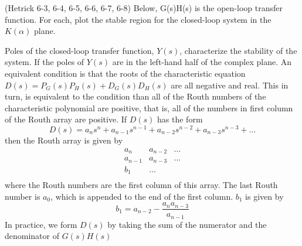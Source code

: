 \documentclass[11pt,addpoints,answers]{exam}
\begin{document}
\begin{questions}
        \question (Hetrick 6-3, 6-4, 6-5, 6-6, 6-7, 6-8) Below, G(s)H(s) is the open-loop transfer function. For each, 
        plot the stable region for the closed-loop system in the $K(\alpha)$ 
        plane.
        \begin{parts}
            Poles of the closed-loop transfer function, $Y(s)$, characterize the
            stability of the system. If the poles of $Y(s)$ are in the
            left-hand half of the complex plane. An equivalent condition is
            that the roots of the characteristic equation
            $D(s)=P_{G}(s)P_{H}(s) + D_{G}(s) D_{H}(s)$ are all negative and
            real. This in turn, is equivalent to the condition than all of the
            Routh numbers of the characteristic polynomial are positive, that
            is, all of the numbers in first column of the Routh array are
            positive. If $D(s)$ has the form
            \[
                D(s) = a_{n}s^{n} + a_{n-1}s^{n-1} + a_{n-2}s^{n-2} +
                a_{n-3}s^{n-3} +\ldots 
            \]
            then the Routh array is given by 
            \[
            \begin{matrix}
                a_n & a_{n-2} & \ldots\\
                a_{n-1} & a_{n-3} & \ldots\\
                b_1 & \ldots & \\
            \end{matrix}
            \]
            where the Routh numbers are the first column of this array. The
            last Routh number is $a_{0}$, which is appended to the end of the
            first column. $b_1$ is given by
            \[
                b_1 = a_{n-2} - \frac{a_{n}a_{n-3}}{a_{n-1}}
            \]
            In practice, we form $D(s)$ by taking the sum of the
            numerator and the denominator of $G(s)H(s)$

\end{parts}
\end{questions}
\end{document}
